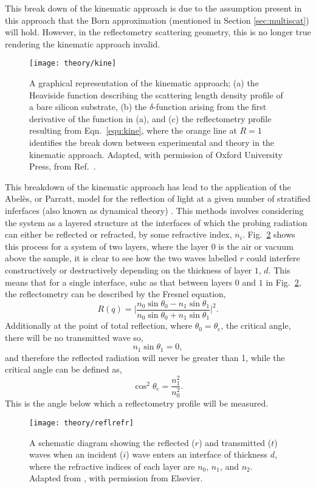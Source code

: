 This break down of the kinematic approach is due to the assumption present in this approach that the Born approximation (mentioned in Section \ref{sec:multiscat}) will hold.
However, in the reflectometry scattering geometry, this is no longer true rendering the kinematic approach invalid.
%
\begin{figure}
	\centering
	\texttt{[image: theory/kine]}
	\caption{A graphical representation of the kinematic approach; (a) the Heaviside function describing the scattering length density profile of a bare silicon substrate, (b) the $\delta$-function arising from the first derivative of the function in (a), and (c) the reflectometry profile resulting from Eqn.~\ref{equ:kine}, where the orange line at $R=1$ identifies the break down between experimental and theory in the kinematic approach. Adapted, with permission of Oxford University Press\textsuperscript{\textcopyright}, from Ref.~\cite{Sivia2011}.}
	\label{fig:kine}
\end{figure}
%

This breakdown of the kinematic approach has lead to the application of the Abel\`{e}s, or Parratt, model for the reflection of light at a given number of stratified inferfaces (also known as dynamical theory) \cite{Abeles1948,Parratt1954}.
This methods involves considering the system as a layered structure at the interfaces of which the probing radiation can either be reflected or refracted, by some refractive index, $n_i$.
Fig.~\ref{fig:reflrefr} shows this process for a system of two layers, where the layer $0$ is the air or vacuum above the sample, it is clear to see how the two waves labelled $r$ could interfere constructively or destructively depending on the thickness of layer $1$, $d$.
This means that for a single interface, suhc as that between layers $0$ and $1$ in Fig.~\ref{fig:reflrefr}, the reflectometry can be described by the Fresnel equation,
%
\begin{equation}
	R(q) = \bigg| \frac{n_0\sin{\theta_0} - n_1\sin{\theta_1}}{n_0\sin{\theta_0} + n_1\sin{\theta_1}} \bigg|^2.
\end{equation}
%
Additionally at the point of total reflection, where $\theta_0 = \theta_{\text{c}}$, the critical angle, there will be no transmitted wave so,
%
\begin{equation}
	n_1\sin{\theta_1} = 0,
\end{equation}
%
and therefore the reflected radiation will never be greater than 1, while the critical angle can be defined as,
%
\begin{equation}
	\cos^2{\theta_{\text{c}}} = \frac{n_1^2}{n_0^2}.
\end{equation}
%
This is the angle below which a reflectometry profile will be measured.
%
\begin{figure}
	\centering
	\texttt{[image: theory/reflrefr]}
	\caption{A schematic diagram showing the reflected ($r$) and transmitted ($t$) waves when an incident ($i$) wave enters an interface of thickness $d$, where the refractive indices of each layer are $n_0$, $n_1$, and $n_2$. Adapted from \cite{Foglia2015}, with permission from Elsevier.}
	\label{fig:reflrefr}
\end{figure}
%

